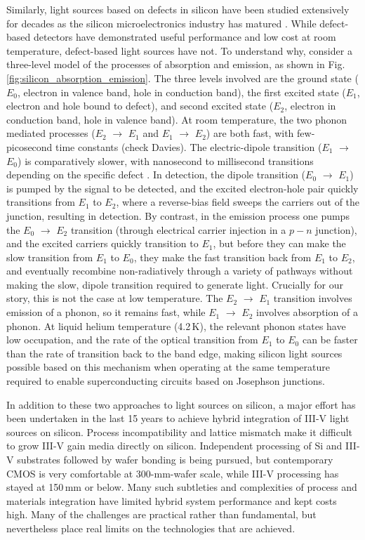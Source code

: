 Similarly, light sources based on defects in silicon have been studied extensively for decades as the silicon microelectronics industry has matured \cite{da1989}. While defect-based detectors have demonstrated useful performance and low cost at room temperature, defect-based light sources have not. To understand why, consider a three-level model of the processes of absorption and emission, as shown in Fig.\,\ref{fig:silicon_absorption_emission}. The three levels involved are the ground state ($E_0$, electron in valence band, hole in conduction band), the first excited state ($E_1$, electron and hole bound to defect), and second excited state ($E_2$, electron in conduction band, hole in valence band). At room temperature, the two phonon mediated processes ($E_2$ $\rightarrow$ $E_1$ and $E_1$ $\rightarrow$ $E_2$) are both fast, with few-picosecond time constants (check Davies). The electric-dipole transition ($E_1$ $\rightarrow$ $E_0$) is comparatively slower, with nanosecond to millisecond transitions depending on the specific defect \cite{}. In detection, the dipole transition ($E_0$ $\rightarrow$ $E_1$) is pumped by the signal to be detected, and the excited electron-hole pair quickly transitions from $E_1$ to $E_2$, where a reverse-bias field sweeps the carriers out of the junction, resulting in detection. By contrast, in the emission process one pumps the $E_0$ $\rightarrow$ $E_2$ transition (through electrical carrier injection in a $p-n$ junction), and the excited carriers quickly transition to $E_1$, but before they can make the slow transition from $E_1$ to $E_0$, they make the fast transition back from $E_1$ to $E_2$, and eventually recombine non-radiatively through a variety of pathways without making the slow, dipole transition required to generate light. Crucially for our story, this is not the case at low temperature. The $E_2$ $\rightarrow$ $E_1$ transition involves emission of a phonon, so it remains fast, while $E_1$ $\rightarrow$ $E_2$ involves absorption of a phonon. At liquid helium temperature (4.2\,K), the relevant phonon states have low occupation, and the rate of the optical transition from $E_1$ to $E_0$ can be faster than the rate of transition back to the band edge, making silicon light sources possible based on this mechanism when operating at the same temperature required to enable superconducting circuits based on Josephson junctions. 

In addition to these two approaches to light sources on silicon, a major effort has been undertaken in the last 15 years to achieve hybrid integration of III-V light sources on silicon. Process incompatibility and lattice mismatch make it difficult to grow III-V gain media directly on silicon. Independent processing of Si and III-V substrates followed by wafer bonding is being pursued, but contemporary CMOS is very comfortable at 300-mm-wafer scale, while III-V processing has stayed at 150\,mm or below. Many such subtleties and complexities of process and materials integration have limited hybrid system performance and kept costs high. Many of the challenges are practical rather than fundamental, but nevertheless place real limits on the technologies that are achieved.

